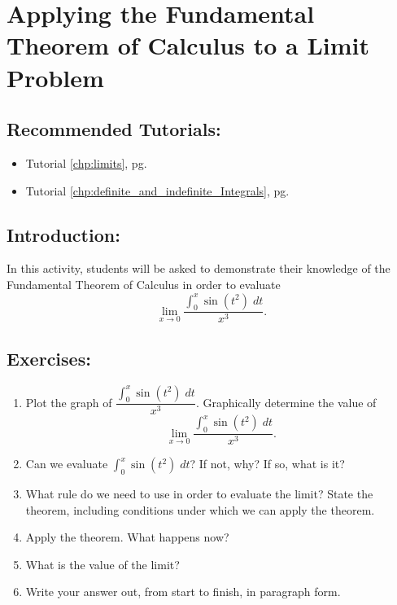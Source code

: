 \section{Applying the Fundamental Theorem of Calculus to a Limit Problem}
\label{sec:ftc_problem}			

\subsection*{Recommended Tutorials:}
\begin{itemize}
	\item Tutorial \ref{chp:limits}, pg. \pageref{chp:limits}
	\item Tutorial \ref{chp:definite_and_indefinite_Integrals}, pg. \pageref{chp:definite_and_indefinite_Integrals}
\end{itemize}

\subsection*{Introduction:}

In this activity, students will be asked to demonstrate their knowledge of the Fundamental Theorem of Calculus in order to evaluate \[\displaystyle\lim_{x \rightarrow 0} \dfrac{\displaystyle\int_{0}^x \sin(t^2) \; dt}{x^3}.\]

\subsection*{Exercises:}

\begin{enumerate}
    \item   Plot the graph of $\dfrac{\displaystyle\int_{0}^x \sin(t^2) \; dt}{x^3}$.  Graphically determine the value of \[\displaystyle\lim_{x \rightarrow 0} \dfrac{\displaystyle\int_{0}^x \sin(t^2) \; dt}{x^3}.\]
    \item   Can we evaluate $\displaystyle\int_{0}^x \sin(t^2) \; dt$?  If not, why?  If so, what is it? 
    \item   What rule do we need to use in order to evaluate the limit?  State the theorem, including conditions under which we can apply the theorem.
    \item   Apply the theorem.  What happens now?
    \item   What is the value of the limit?
    \item   Write your answer out, from start to finish, in paragraph form.
\end{enumerate}

